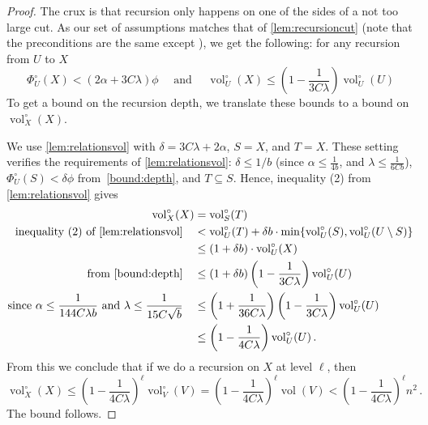 \documentclass[epsfig,letter,11pt]{article}
\numberwithin{equation}{section}
\DeclareMathOperator{\vol}{vol}
\newcommand{\unvolc}[2]{\operatorname{vol}_{#2}^\circ (#1)}
\newcommand{\unspc}[2]{\Phi_{#2}^\circ (#1)}
\begin{document}
\begin{proof}
	The crux is that recursion only happens on one of the sides of a not too large cut. As our set of assumptions matches that of \cref{lem:recursioncut} (note that the preconditions are the same except ), we get the following: for any recursion from $U$ to $X$
	\begin{equation}
		\label{bound:depth}
		\unspc{X}{U} < (2\alpha+3C\lambda)\phi \quad \text{ and } \quad \unvolc{X}{U} \le \left(1-\frac{1}{3C\lambda}\right) \unvolc{U}{U}
	\end{equation}
	To get a bound on the recursion depth, we translate these bounds to a bound on $\unvolc{X}{X}$.
	
	We use \cref{lem:relationsvol} with $\delta=3C\lambda+2\alpha$, $S=X$, and $T=X$. These setting verifies the requirements of \cref{lem:relationsvol}: $\delta \le 1/b$ (since $\alpha \le \frac{1}{4b}$, and $\lambda \leq \frac{1}{6Cb}$), $\unspc{S}{U} < \delta \phi$ from~\eqref{bound:depth}, and $T \subseteq S$. Hence, inequality (2) from \cref{lem:relationsvol} gives
	\begin{align*}
		\unvolc{X}{X}& = \unvolc{T}{S} \\
		\text{inequality (2) of~\cref{lem:relationsvol}}\quad &< \unvolc{T}{U} + \delta b \cdot \min\{\unvolc{S}{U}, \unvolc{U \setminus S}{U}\} \\
		& \le  (1+\delta b) \cdot \unvolc{X}{U} \\
		\text{from~\eqref{bound:depth}}\quad & \le \left(1+\delta b\right) \left(1-\frac{1}{3C\lambda}\right) \unvolc{U}{U} \\
		\text{since $\alpha \le \frac{1}{144C\lambda b}$ and $\lambda \le \frac{1}{15C \sqrt{b}}$}\quad & \le \left(1+\frac{1}{36C\lambda}\right) \left(1-\frac{1}{3C\lambda}\right) \unvolc{U}{U} \\
		& \le  \left(1-\frac{1}{4C\lambda}\right) \unvolc{U}{U} \, .
	\end{align*}
	From this we conclude that if we do a recursion on $X$ at level $\ell$, then
	\begin{equation*}
	\unvolc{X}{X} \le  \left(1-\frac{1}{4C\lambda}\right)^\ell \unvolc{V}{V} =  \left(1-\frac{1}{4C\lambda}\right)^\ell \vol(V) <  \left(1-\frac{1}{4C\lambda}\right)^\ell n^2 \, .
	\end{equation*}
	The bound follows.
\end{proof}
\end{document}
